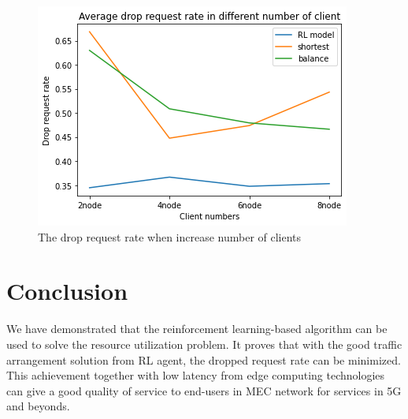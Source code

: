 \documentclass[conference]{IEEEtran}
\begin{document}
\begin{figure}[]
    \centering
    \includegraphics[scale = 0.5]{imgs/increase_ingress_clients.png}
    \caption{The drop request rate when increase number of clients}
    \label{fig:increase_ingress_clients}
\end{figure}



\section{Conclusion}
\label{sec:Conclusion}
We have demonstrated that the reinforcement learning-based algorithm can be used to solve the resource utilization problem. It proves that with the good traffic arrangement solution from RL agent, the dropped request rate can be minimized. This achievement together with low latency from edge computing technologies can give a good quality of service to end-users in MEC network for services in 5G and beyonds.



\end{document}
